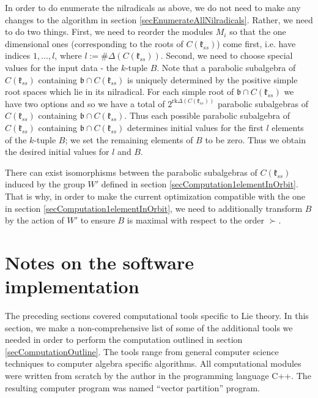\documentclass[12pt]{report}
\newcommand{\kk}{\mathfrak{k}}
\newcommand{\bb}{\mathfrak{b}}
\newcommand{\rk}{\mathrm{rk}}
\begin{document}
In order to do enumerate the nilradicals as above, we do not need to make any changes to the  algorithm in section \ref{secEnumerateAllNilradicals}. Rather, we need to do two things. First, we need to reorder the modules $M_i$ so that the one dimensional ones (corresponding to the roots of $C(\kk_{ss})$) come first, i.e. have indices $1,\dots, l$, where $l:=\#\Delta(C(\kk_{ss}))$. Second, we need to choose special values for the input data - the $k$-tuple $B$. Note that a parabolic subalgebra of $C(\kk_{ss})$ containing $\bb\cap C(\kk_{ss})$ is uniquely determined by the positive simple root spaces which lie in its nilradical. For each simple root of $\bb\cap C(\kk_{ss})$ we have two options and so we have a total of $2^{\rk \Delta(C(\kk_{ss}))}$ parabolic subalgebras of $C(\kk_{ss})$ containing $\bb\cap C(\kk_{ss})$. Thus each possible parabolic subalgebra of $C(\kk_{ss})$ containing $\bb\cap C(\kk_{ss})$ determines initial values for the first $l$ elements of the $k$-tuple $B$; we set the remaining elements of $B$ to be zero. Thus we obtain the desired initial values for $l$ and $B$. 

There can exist isomorphisms between the parabolic subalgebras of $C(\kk_{ss})$ induced by the group $W'$ defined in section \ref{secComputation1elementInOrbit}. That is why, in order to make the current optimization compatible with the one in section \ref{secComputation1elementInOrbit}, we need to additionally transform $B$ by the action of $W'$ to ensure $B$ is maximal with respect to the order $\succ$.

\section{Notes on the software implementation}
The preceding sections covered computational tools specific to Lie theory. In this section, we make a non-comprehensive list of some of the additional tools we needed in order to perform the computation outlined in section \ref{secComputationOutline}. The tools range from general computer science techniques to computer algebra specific algorithms. All computational modules were written from scratch by the author in the programming language C++. The resulting computer program was named ``vector partition'' program.
\end{document}

